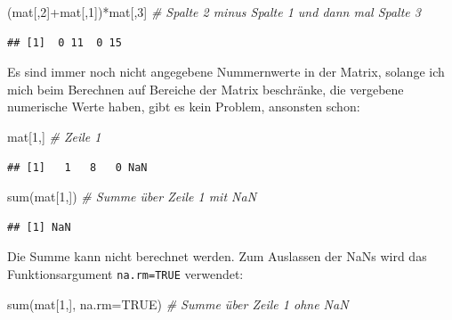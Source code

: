 \documentclass[
]{book}
\newenvironment{Shaded}{\begin{snugshade}}{\end{snugshade}}
\newcommand{\AttributeTok}[1]{\textcolor[rgb]{0.77,0.63,0.00}{#1}}
\newcommand{\CommentTok}[1]{\textcolor[rgb]{0.56,0.35,0.01}{\textit{#1}}}
\newcommand{\ConstantTok}[1]{\textcolor[rgb]{0.00,0.00,0.00}{#1}}
\newcommand{\DecValTok}[1]{\textcolor[rgb]{0.00,0.00,0.81}{#1}}
\newcommand{\FunctionTok}[1]{\textcolor[rgb]{0.00,0.00,0.00}{#1}}
\newcommand{\NormalTok}[1]{#1}
\newcommand{\SpecialCharTok}[1]{\textcolor[rgb]{0.00,0.00,0.00}{#1}}
\theoremstyle{definition}
\theoremstyle{definition}
\theoremstyle{definition}
\theoremstyle{definition}
\theoremstyle{remark}
\begin{document}
\begin{Shaded}
\begin{Highlighting}[]
\NormalTok{(mat[,}\DecValTok{2}\NormalTok{]}\SpecialCharTok{+}\NormalTok{mat[,}\DecValTok{1}\NormalTok{])}\SpecialCharTok{*}\NormalTok{mat[,}\DecValTok{3}\NormalTok{]             }\CommentTok{\# Spalte 2 minus Spalte 1 und dann mal Spalte 3}
\end{Highlighting}
\end{Shaded}

\begin{verbatim}
## [1]  0 11  0 15
\end{verbatim}

Es sind immer noch nicht angegebene Nummernwerte in der Matrix, solange ich mich beim Berechnen auf Bereiche der Matrix beschränke, die vergebene numerische Werte haben, gibt es kein Problem, ansonsten schon:

\begin{Shaded}
\begin{Highlighting}[]
\NormalTok{mat[}\DecValTok{1}\NormalTok{,]                   }\CommentTok{\# Zeile 1}
\end{Highlighting}
\end{Shaded}

\begin{verbatim}
## [1]   1   8   0 NaN
\end{verbatim}

\begin{Shaded}
\begin{Highlighting}[]
\FunctionTok{sum}\NormalTok{(mat[}\DecValTok{1}\NormalTok{,])         }\CommentTok{\# Summe über Zeile 1 mit NaN}
\end{Highlighting}
\end{Shaded}

\begin{verbatim}
## [1] NaN
\end{verbatim}

Die Summe kann nicht berechnet werden. Zum Auslassen der NaNs wird das Funktionsargument \texttt{na.rm=TRUE} verwendet:

\begin{Shaded}
\begin{Highlighting}[]
\FunctionTok{sum}\NormalTok{(mat[}\DecValTok{1}\NormalTok{,], }\AttributeTok{na.rm=}\ConstantTok{TRUE}\NormalTok{)  }\CommentTok{\# Summe über Zeile 1 ohne NaN}
\end{Highlighting}
\end{Shaded}
\end{document}
